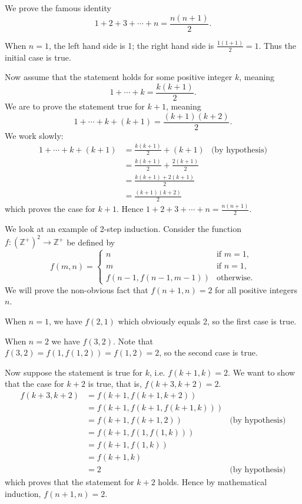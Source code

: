 \begin{example}
    We prove the famous identity
    \[
        1 + 2 + 3 + \cdots + n = \frac{n(n+1)}2.
    \]

    When $n = 1$, the left hand side is 1; the right hand side is $\frac{1(1+1)}{2} = 1$. Thus the initial case is true.

    Now assume that the statement holds for some positive integer $k$, meaning
    \[
        1 + \cdots + k = \frac{k(k+1)}2.
    \]
    We are to prove the statement true for $k+1$, meaning
    \[
        1 + \cdots + k + (k+1) = \frac{(k+1)(k+2)}2.
    \]
    We work slowly:
    \begin{align*}
        1 + \cdots + k + (k+1) &= \frac{k(k+1)}{2} + (k+1) & \text{(by hypothesis)}\\
        &= \frac{k(k+1)}2 + \frac{2(k+1)}{2}\\
        &= \frac{k(k+1) + 2(k+1)}2\\
        &= \frac{(k+1)(k+2)}2
    \end{align*}
    which proves the case for $k + 1$. Hence $1 + 2 + 3 + \cdots + n = \frac{n(n+1)}2$.
\end{example}

\begin{example}
    We look at an example of 2-step induction. Consider the function $f: \left(\mathbb{Z}^+\right)^2\to\mathbb{Z}^+$ be defined by
    \[
        f(m, n) =
        \begin{cases}
            n & \text{if } m = 1, \\
            m & \text{if } n = 1, \\
            f\left(n-1,f(n-1,m-1)\right) & \text{otherwise.}
        \end{cases}
    \]
    We will prove the non-obvious fact that $f(n+1, n) = 2$ for all positive integers $n$.

    When $n = 1$, we have $f(2, 1)$ which obviously equals 2, so the first case is true.

    When $n = 2$ we have $f(3, 2)$. Note that $f(3,2) = f(1, f(1, 2)) = f(1, 2) = 2$, so the second case is true.

    Now suppose the statement is true for $k$, i.e. $f(k+1,k) = 2$. We want to show that the case for $k+2$ is true, that is, $f(k+3, k+2) = 2$.
    \begin{align*}
        f(k+3, k+2) &= f(k+1, f(k+1, k+2))\\
        &= f(k+1, f(k+1, f(k+1, k)))\\
        &= f(k+1, f(k+1, 2)) & \text{(by hypothesis)}\\
        &= f(k+1, f(1, f(1, k)))\\
        &= f(k+1, f(1, k))\\
        &= f(k+1, k)\\
        &= 2 & \text{(by hypothesis)}
    \end{align*}
    which proves that the statement for $k+2$ holds. Hence by mathematical induction, $f(n+1, n) = 2$.
\end{example}

